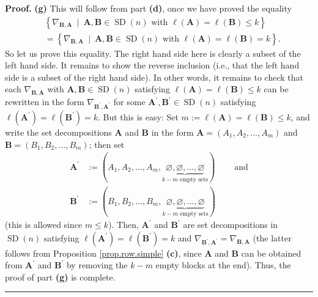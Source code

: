 \documentclass[numbers=enddot,12pt,final,onecolumn,notitlepage]{scrartcl}%
\numberwithin{exer}{subsection}
\theoremstyle{definition}
\newenvironment{proof}[1][Proof]{\noindent\textbf{#1.} }{\ \rule{0.5em}{0.5em}}
\begin{document}
\begin{proof}
\textbf{(g)} This will follow from part \textbf{(d)}, once we have proved the
equality%
\begin{align*}
&  \left\{  \nabla_{\mathbf{B},\mathbf{A}}\ \mid\ \mathbf{A},\mathbf{B}%
\in\operatorname*{SD}\left(  n\right)  \text{ with }\ell\left(  \mathbf{A}%
\right)  =\ell\left(  \mathbf{B}\right)  \leq k\right\} \\
&  =\left\{  \nabla_{\mathbf{B},\mathbf{A}}\ \mid\ \mathbf{A},\mathbf{B}%
\in\operatorname*{SD}\left(  n\right)  \text{ with }\ell\left(  \mathbf{A}%
\right)  =\ell\left(  \mathbf{B}\right)  =k\right\}  .
\end{align*}
So let us prove this equality. The right hand side here is clearly a subset of
the left hand side. It remains to show the reverse inclusion (i.e., that the
left hand side is a subset of the right hand side). In other words, it remains
to check that each $\nabla_{\mathbf{B},\mathbf{A}}$ with $\mathbf{A}%
,\mathbf{B}\in\operatorname*{SD}\left(  n\right)  $ satisfying $\ell\left(
\mathbf{A}\right)  =\ell\left(  \mathbf{B}\right)  \leq k$ can be rewritten in
the form $\nabla_{\mathbf{B}^{\prime},\mathbf{A}^{\prime}}$ for some
$\mathbf{A}^{\prime},\mathbf{B}^{\prime}\in\operatorname*{SD}\left(  n\right)
$ satisfying $\ell\left(  \mathbf{A}^{\prime}\right)  =\ell\left(
\mathbf{B}^{\prime}\right)  =k$. But this is easy: Set $m:=\ell\left(
\mathbf{A}\right)  =\ell\left(  \mathbf{B}\right)  \leq k$, and write the set
decompositions $\mathbf{A}$ and $\mathbf{B}$ in the form $\mathbf{A}=\left(
A_{1},A_{2},\ldots,A_{m}\right)  $ and $\mathbf{B}=\left(  B_{1},B_{2}%
,\ldots,B_{m}\right)  $; then set%
\begin{align*}
\mathbf{A}^{\prime}  &  :=\left(  A_{1},A_{2},\ldots,A_{m}%
,\underbrace{\varnothing,\varnothing,\ldots,\varnothing}_{k-m\text{ empty
sets}}\right)  \ \ \ \ \ \ \ \ \ \ \text{and}\\
\mathbf{B}^{\prime}  &  :=\left(  B_{1},B_{2},\ldots,B_{m}%
,\underbrace{\varnothing,\varnothing,\ldots,\varnothing}_{k-m\text{ empty
sets}}\right)
\end{align*}
(this is allowed since $m\leq k$). Then, $\mathbf{A}^{\prime}$ and
$\mathbf{B}^{\prime}$ are set decompositions in $\operatorname*{SD}\left(
n\right)  $ satisfying $\ell\left(  \mathbf{A}^{\prime}\right)  =\ell\left(
\mathbf{B}^{\prime}\right)  =k$ and $\nabla_{\mathbf{B}^{\prime}%
,\mathbf{A}^{\prime}}=\nabla_{\mathbf{B},\mathbf{A}}$ (the latter follows from
Proposition \ref{prop.row.simple} \textbf{(c)}, since $\mathbf{A}$ and
$\mathbf{B}$ can be obtained from $\mathbf{A}^{\prime}$ and $\mathbf{B}%
^{\prime}$ by removing the $k-m$ empty blocks at the end). Thus, the proof of
part \textbf{(g)} is complete.
\end{proof}
\end{document}

